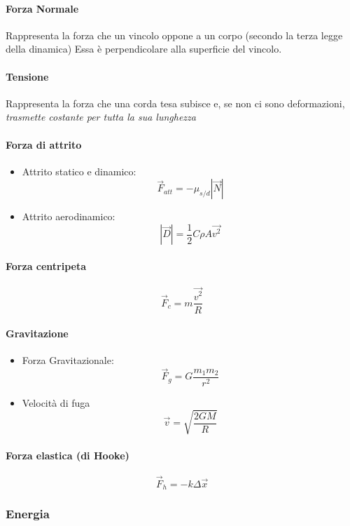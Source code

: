 \documentclass[12pt]{article}
\begin{document}
            \paragraph*{Forza Normale}
            Rappresenta la forza che un vincolo oppone a un corpo (secondo la terza legge della dinamica)
            Essa è perpendicolare alla superficie del vincolo.
            \paragraph*{Tensione}
            Rappresenta la forza che una corda tesa subisce e, se non ci sono deformazioni, \emph{trasmette costante per tutta la sua lunghezza}
            \paragraph*{Forza di attrito}
            \begin{itemize}
                \item Attrito statico e dinamico: \[\vec{F}_{att} = - \mu_{s/d}|\vec{N}|\]
                \item Attrito aerodinamico: \[|\vec{D}| = \frac{1}{2}C\rho A\vec{v^2}\]
            \end{itemize}
            \paragraph*{Forza centripeta}
            \[\vec{F}_c = m\frac{\vec{v^2}}{R}\]
            \paragraph*{Gravitazione}
            \begin{itemize}
                \item Forza Gravitazionale:
                \[\vec{F}_g = G\frac{m_1 m_2}{r^2}\]
                \item Velocità di fuga
                \[\vec{v} = \sqrt{\frac{2GM}{R}}\]
            \end{itemize}
            \paragraph*{Forza elastica (di Hooke)}
            \[\vec{F}_h = -k\Delta \vec{x}\]
            \newpage
        \subsubsection{Energia}
\end{document}
